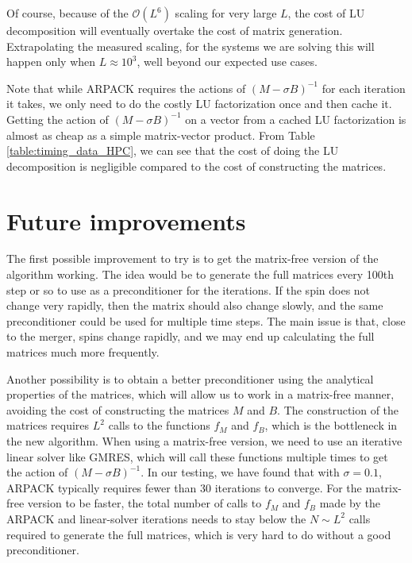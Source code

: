 \documentclass{iopjournal}
\begin{document}
Of course, because of the $\mathcal{O}(L^6)$ scaling for very large $L$, the
cost of LU decomposition will eventually overtake the cost of matrix
generation. Extrapolating the measured scaling, for the systems we are
solving this will happen only when $L \approx 10^3$, well beyond our
expected use cases.

Note that while ARPACK requires the actions of $(M- \sigma B)^{-1}$
for each iteration it takes, we only need to do the costly LU
factorization once and then cache it. Getting the action of $(M-
\sigma B)^{-1}$ on a vector from a cached LU factorization is almost as cheap
as a simple matrix-vector product. From Table
\ref{table:timing_data_HPC}, we can see that the cost of doing the LU
decomposition is negligible compared to the cost of constructing the
matrices.


\section{\label{sec:Future improvements} Future improvements}

The first possible improvement to try is to get the matrix-free version of the algorithm working. The idea would be to generate the full matrices every 100th step or so to use as a preconditioner for the iterations. If the spin does not change very rapidly, then the matrix should also change slowly, and the same preconditioner could be used for multiple time steps. The main issue is that, close to the merger, spins change rapidly, and we may end up calculating the full matrices much more frequently. 

Another possibility is to obtain a better preconditioner using the analytical properties of the matrices, which will allow us to work in a matrix-free manner, avoiding the cost of constructing the matrices $M$ and $B$. The construction of the matrices requires $L^2$ calls to the functions $f_M$ and $f_B$, which is the bottleneck in the new algorithm. When using a matrix-free version, we need to use an iterative linear solver like GMRES, which will call these functions multiple times to get the action of $(M-\sigma B)^{-1}$. In our testing, we have found that with $\sigma = 0.1$, ARPACK typically requires fewer than 30 iterations to converge. For the matrix-free version to be faster, the total number of calls to $f_M$ and $f_B$ made by the ARPACK and linear-solver iterations needs to stay below the $N\sim L^2$ calls required to generate the full matrices, which is very hard to do without a good preconditioner. 
\end{document}
